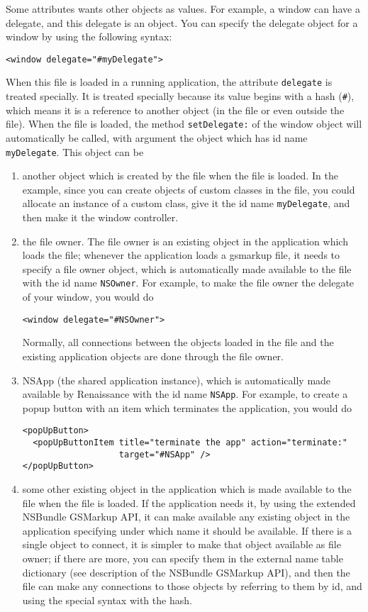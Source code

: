 Some attributes wants other objects as values.  For example, a window
can have a delegate, and this delegate is an object.  You can specify
the delegate object for a window by using the following syntax:
\begin{verbatim}
<window delegate="#myDelegate">
\end{verbatim}
When this file is loaded in a running application, the attribute 
\texttt{delegate} is treated specially.  It is treated specially because
its value begins with a hash (\texttt{\#}), which means it is a
reference to another object (in the file or even outside the file).
When the file is loaded, the method \texttt{setDelegate:} of the
window object will automatically be called, with argument the object
which has id name \texttt{myDelegate}.  This object can be 
\begin{enumerate}
\item another object which is created by the file when the file is loaded. 
     In the example, since you can create objects of custom classes in
     the file, you could allocate an instance of a custom class, give
     it the id name \texttt{myDelegate}, and then make it the window
     controller.

\item the file owner.  The file owner is an existing object in the application 
     which loads the file; whenever the application loads a gsmarkup file,
     it needs to specify a file owner object, which is automatically
     made available to the file with the id name \texttt{NSOwner}.
     For example, to make the file owner the delegate of your window,
     you would do
\begin{verbatim}
<window delegate="#NSOwner">
\end{verbatim}
     Normally, all connections between the objects loaded in the file
     and the existing application objects are done through the file
     owner.

\item NSApp (the shared application instance), which is automatically 
     made available by Renaissance with the id name \texttt{NSApp}.
     For example, to create a popup button with an item which
     terminates the application, you would do
\begin{verbatim}
<popUpButton>
  <popUpButtonItem title="terminate the app" action="terminate:"
                   target="#NSApp" />
</popUpButton>
\end{verbatim}

\item some other existing object in the application which is made available 
     to the file when the file is loaded.  If the application needs
     it, by using the extended NSBundle GSMarkup API, it can make
     available any existing object in the application specifying under
     which name it should be available.  If there is a single object
     to connect, it is simpler to make that object available as file
     owner; if there are more, you can specify them in the external
     name table dictionary (see description of the NSBundle GSMarkup
     API), and then the file can make any connections to those objects
     by referring to them by id, and using the special syntax with the
     hash.


\end{enumerate}
